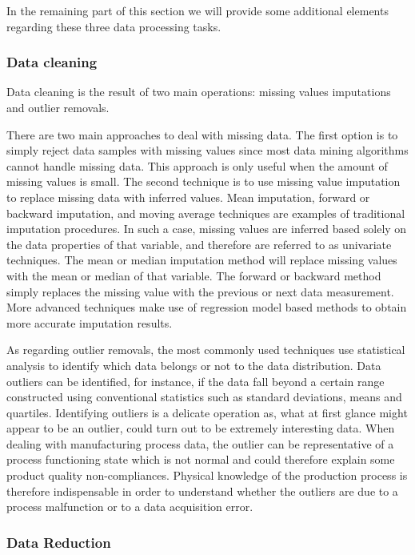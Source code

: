 In the remaining part of this section we will provide some additional elements regarding these three data processing tasks. 
  
\subsubsection{Data cleaning}


Data cleaning is the result of two main operations: missing values imputations and outlier removals.

There are two main approaches to deal with missing data. The first option is to simply reject data samples with missing values since most data mining algorithms cannot handle missing data. This approach is only useful when the amount of missing values is small. The second technique is to use missing value imputation to replace missing data with inferred values. Mean imputation, forward or backward imputation, and moving average techniques are examples of traditional imputation procedures. In such a case, missing values are inferred based solely on the data properties of that variable, and therefore are referred to as univariate techniques. The mean or median imputation method will replace missing values with the mean or median of that variable. The forward or backward method simply replaces the missing value with the previous or next data measurement. More advanced techniques make use of regression model based methods to obtain more accurate imputation results. 

As regarding outlier removals, the most commonly used techniques use statistical analysis to identify which data belongs or not to the data distribution. Data outliers can be identified, for instance, if the data fall beyond a certain range constructed using conventional statistics such as standard deviations, means and quartiles. Identifying outliers is a delicate operation as, what at first glance might appear to be an outlier, could turn out to be extremely interesting data. When dealing with manufacturing process data, the outlier can be representative of a process functioning state which is not normal and could therefore explain some product quality non-compliances. Physical knowledge of the production process is therefore indispensable in order to understand whether the outliers are due to a process malfunction or to a data acquisition error.    


\subsubsection{Data Reduction}

